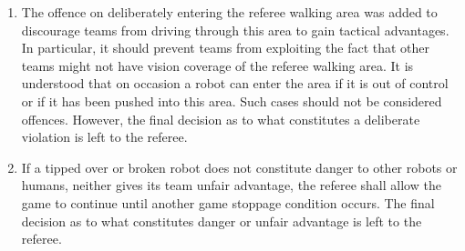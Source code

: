 \begin{enumerate}
\item
The offence on deliberately entering the referee walking area was added to discourage teams from driving through this area to gain tactical advantages.
In particular, it should prevent teams from exploiting the fact that other teams might not have vision coverage of the referee walking area.
It is understood that on occasion a robot can enter the area if it is out of control or if it has been pushed into this area.
Such cases should not be considered offences.
However, the final decision as to what constitutes a deliberate violation is left to the referee.

\item
If a tipped over or broken robot does not constitute danger to other robots or humans, neither gives its team unfair advantage, the referee shall allow the game to continue until another game stoppage condition occurs.
The final decision as to what constitutes danger or unfair advantage is left to the referee.
\end{enumerate}

